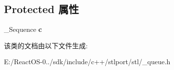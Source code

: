 \subsection*{Protected 属性}
\begin{DoxyCompactItemize}
\item 
\mbox{\label{classqueue_a1d1e9c3d5431db5fc11ad92f27f89fd9}} 
\+\_\+\+Sequence {\bfseries c}
\end{DoxyCompactItemize}


该类的文档由以下文件生成\+:\begin{DoxyCompactItemize}
\item 
E\+:/\+React\+O\+S-\/0../sdk/include/c++/stlport/stl/\+\_\+queue.\+h\end{DoxyCompactItemize}
